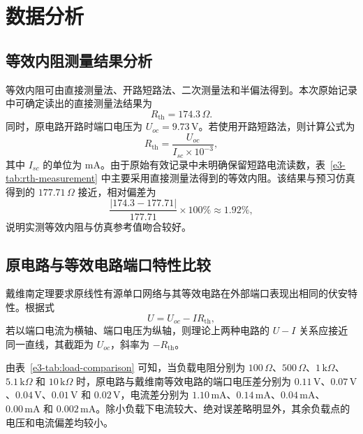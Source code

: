 \section{数据分析}

\subsection{等效内阻测量结果分析}

等效内阻可由直接测量法、开路短路法、二次测量法和半偏法得到。本次原始记录中可确定读出的直接测量法结果为
\begin{equation}
    R_{\mathrm{th}}=174.3\,\Omega.
\end{equation}
同时，原电路开路时端口电压为 \(U_{oc}=9.73\,\mathrm{V}\)。若使用开路短路法，则计算公式为
\begin{equation}
    R_{\mathrm{th}}=\frac{U_{oc}}{I_{sc}\times 10^{-3}},
\end{equation}
其中 \(I_{sc}\) 的单位为 \(\mathrm{mA}\)。由于原始有效记录中未明确保留短路电流读数，表~\ref{e3-tab:rth-measurement} 中主要采用直接测量法得到的等效内阻。该结果与预习仿真得到的 \(177.71\,\Omega\) 接近，相对偏差为
\begin{equation}
    \frac{|174.3-177.71|}{177.71}\times100\% \approx 1.92\%,
\end{equation}
说明实测等效内阻与仿真参考值吻合较好。

\subsection{原电路与等效电路端口特性比较}

戴维南定理要求原线性有源单口网络与其等效电路在外部端口表现出相同的伏安特性。根据式
\begin{equation}
    U = U_{oc} - I R_{\mathrm{th}},
\end{equation}
若以端口电流为横轴、端口电压为纵轴，则理论上两种电路的 \(U-I\) 关系应接近同一直线，其截距为 \(U_{oc}\)，斜率为 \(-R_{\mathrm{th}}\)。

由表~\ref{e3-tab:load-comparison} 可知，当负载电阻分别为 \(100\,\Omega\)、\(500\,\Omega\)、\(1\,\mathrm{k}\Omega\)、\(5.1\,\mathrm{k}\Omega\) 和 \(10\,\mathrm{k}\Omega\) 时，原电路与戴维南等效电路的端口电压差分别为 \(0.11\,\mathrm{V}\)、\(0.07\,\mathrm{V}\)、\(0.04\,\mathrm{V}\)、\(0.01\,\mathrm{V}\) 和 \(0.02\,\mathrm{V}\)，电流差分别为 \(1.10\,\mathrm{mA}\)、\(0.14\,\mathrm{mA}\)、\(0.04\,\mathrm{mA}\)、\(0.00\,\mathrm{mA}\) 和 \(0.002\,\mathrm{mA}\)。除小负载下电流较大、绝对误差略明显外，其余负载点的电压和电流偏差均较小。

